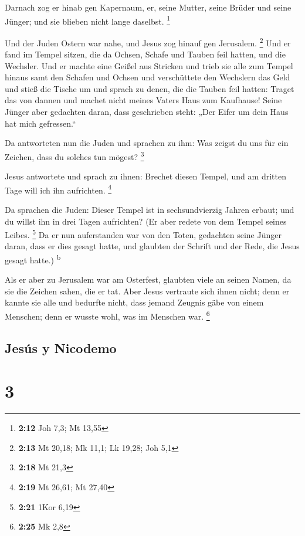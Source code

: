  Darnach zog er hinab gen Kapernaum, er, seine Mutter,
seine Brüder und seine Jünger; und sie blieben nicht lange daselbst.
\footnote{\textbf{2:12} Joh 7,3; Mt 13,55}

 Und der Juden Ostern war nahe, und Jesus zog hinauf gen
Jerusalem. \footnote{\textbf{2:13} Mt 20,18; Mk 11,1; Lk 19,28; Joh 5,1}
 Und er fand im Tempel sitzen, die da Ochsen, Schafe und
Tauben feil hatten, und die Wechsler.  Und er machte eine
Geißel aus Stricken und trieb sie alle zum Tempel hinaus samt den
Schafen und Ochsen und verschüttete den Wechslern das Geld und stieß die
Tische um  und sprach zu denen, die die Tauben feil
hatten: Traget das von dannen und machet nicht meines Vaters Haus zum
Kaufhause!  Seine Jünger aber gedachten daran, dass
geschrieben steht: „Der Eifer um dein Haus hat mich gefressen.``

 Da antworteten nun die Juden und sprachen zu ihm: Was
zeigst du uns für ein Zeichen, dass du solches tun mögest? \footnote{\textbf{2:18}
  Mt 21,3}

 Jesus antwortete und sprach zu ihnen: Brechet diesen
Tempel, und am dritten Tage will ich ihn aufrichten. \footnote{\textbf{2:19}
  Mt 26,61; Mt 27,40}

 Da sprachen die Juden: Dieser Tempel ist in
sechsundvierzig Jahren erbaut; und du willst ihn in drei Tagen
aufrichten?  (Er aber redete von dem Tempel seines
Leibes. \footnote{\textbf{2:21} 1Kor 6,19}  Da er nun
auferstanden war von den Toten, gedachten seine Jünger daran, dass er
dies gesagt hatte, und glaubten der Schrift und der Rede, die Jesus
gesagt hatte.) \textsuperscript{b}

 Als er aber zu Jerusalem war am Osterfest, glaubten
viele an seinen Namen, da sie die Zeichen sahen, die er tat.
 Aber Jesus vertraute sich ihnen nicht; denn er kannte
sie alle  und bedurfte nicht, dass jemand Zeugnis gäbe
von einem Menschen; denn er wusste wohl, was im Menschen war.
\footnote{\textbf{2:25} Mk 2,8}

\hypertarget{jesuxfas-y-nicodemo}{%
\subsection{Jesús y Nicodemo}\label{jesuxfas-y-nicodemo}}

\hypertarget{section-2}{%
\section{3}\label{section-2}}

